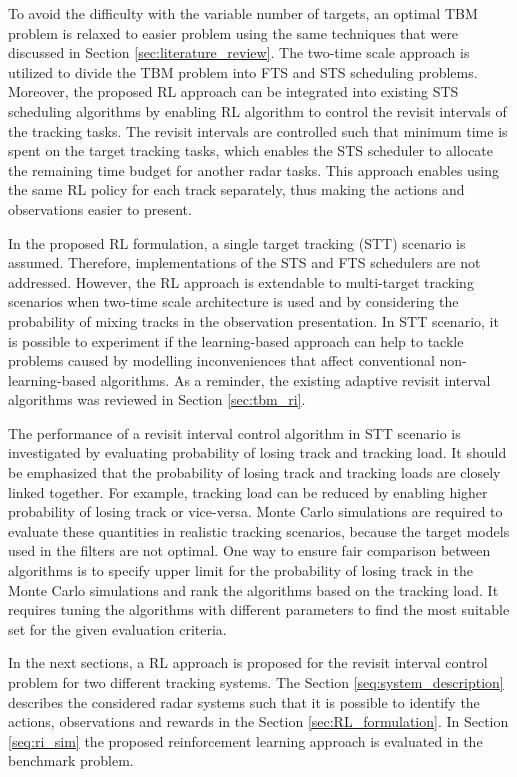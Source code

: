 \documentclass[english, 12pt, a4paper, elec, utf8, a-1b, online]{aaltothesis}
\begin{document}
To avoid the difficulty with the variable number of targets, an optimal TBM problem is relaxed to easier problem using the same techniques that were discussed in Section \ref{sec:literature_review}.
The two-time scale approach is utilized to divide the TBM problem into FTS and STS scheduling problems.
Moreover, the proposed RL approach can be integrated into existing STS scheduling algorithms by enabling RL algorithm to control the revisit intervals of the tracking tasks.
The revisit intervals are controlled such that minimum time is spent on the target tracking tasks, which enables the STS scheduler to allocate the remaining time budget for another radar tasks.
This approach enables using the same RL policy for each track separately, thus making the actions and observations easier to present.

In the proposed RL formulation, a single target tracking (STT) scenario is assumed. 
Therefore, implementations of the STS and FTS schedulers are not addressed.
However, the RL approach is extendable to multi-target tracking scenarios when two-time scale architecture is used and by considering the probability of mixing tracks in the observation presentation. 
In STT scenario, it is possible to experiment if the learning-based approach can help to tackle problems caused by modelling inconveniences that affect conventional non-learning-based algorithms.
As a reminder, the existing adaptive revisit interval algorithms was reviewed in Section \ref{sec:tbm_ri}.

The performance of a revisit interval control algorithm in STT scenario is investigated by evaluating probability of losing track and tracking load.
It should be emphasized that the probability of losing track and tracking loads are closely linked together.
For example, tracking load can be reduced by enabling higher probability of losing track or vice-versa.
Monte Carlo simulations are required to evaluate these quantities in realistic tracking scenarios, because the target models used in the filters are not optimal.
One way to ensure fair comparison between algorithms is to specify upper limit for the probability of losing track in the Monte Carlo simulations and rank the algorithms based on the tracking load.
It requires tuning the algorithms with different parameters to find the most suitable set for the given evaluation criteria.

In the next sections, a RL approach is proposed for the revisit interval control problem for two different tracking systems.
The Section \ref{seq:system_description} describes the considered radar systems
such that it is possible to identify the actions, observations and rewards in the Section \ref{sec:RL_formulation}.
In Section \ref{seq:ri_sim} the proposed reinforcement learning approach is evaluated in the benchmark problem. 
\end{document}
